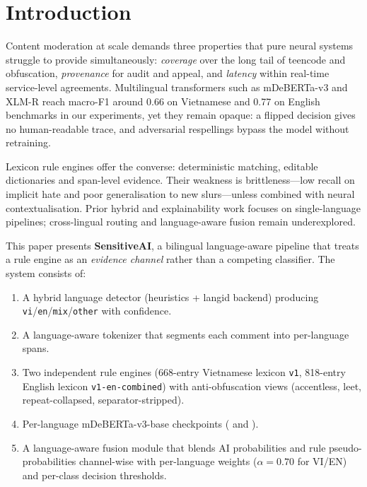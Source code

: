 \section{Introduction}
\label{sec:introduction}

Content moderation at scale demands three properties that pure neural systems
struggle to provide simultaneously: \emph{coverage} over the long tail of
teencode and obfuscation, \emph{provenance} for audit and appeal, and
\emph{latency} within real-time service-level agreements.  Multilingual
transformers such as mDeBERTa-v3 and XLM-R \cite{he2023debertav3,conneau2020xlmr}
reach macro-F1 around 0.66 on Vietnamese and 0.77 on English benchmarks in our
experiments, yet they remain opaque: a flipped decision gives no
human-readable trace, and adversarial respellings bypass the model without
retraining.

Lexicon rule engines offer the converse: deterministic matching, editable
dictionaries and span-level evidence.  Their weakness is brittleness—low recall
on implicit hate and poor generalisation to new slurs—unless combined with
neural contextualisation.  Prior hybrid and explainability work
\cite{waseem2016hateful,mathew2021hatexplain} focuses on single-language
pipelines; cross-lingual routing and language-aware fusion remain
underexplored.

This paper presents \textbf{SensitiveAI}, a bilingual language-aware pipeline
that treats a rule engine as an \emph{evidence channel} rather than a competing
classifier.  The system consists of:
\begin{enumerate}
    \item A hybrid language detector (heuristics + langid backend) producing
          \texttt{vi}/\texttt{en}/\texttt{mix}/\texttt{other} with confidence.
    \item A language-aware tokenizer that segments each comment into
          per-language spans.
    \item Two independent rule engines (668-entry Vietnamese lexicon
          \texttt{v1}, 818-entry English lexicon \texttt{v1-en-combined})
          with anti-obfuscation views (accentless, leet, repeat-collapsed,
          separator-stripped).
    \item Per-language mDeBERTa-v3-base checkpoints (
          and ).
    \item A language-aware fusion module that blends AI probabilities and rule
          pseudo-probabilities channel-wise with per-language weights
          ($\alpha=0.70$ for VI/EN) and per-class decision thresholds.
\end{enumerate}

